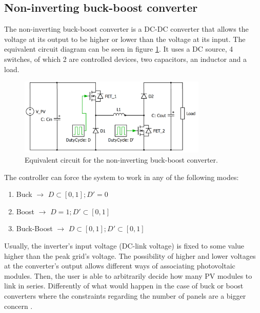 
\subsection{Non-inverting buck-boost converter\label{N_INV_BB}}
		
The non-inverting buck-boost converter is a DC-DC converter that allows the voltage at its output to be higher or lower than the voltage at its input. The equivalent circuit diagram can be seen in figure \ref{N_INV_BB_SCHEMATIC}. It uses a DC source, 4 switches, of which 2 are controlled devices, two capacitors, an inductor and a load.
		
\begin{figure}[H]
	\begin{center}
	\includegraphics[width=0.8\textwidth]{../Pictures/2_d_H_B_BB}
	\caption{Equivalent circuit for the non-inverting buck-boost converter.}
	\label{N_INV_BB_SCHEMATIC}
	\end{center}	
\end{figure}
	
The controller can force the system to work in any of the following modes:

\begin{enumerate}
	\item Buck $\rightarrow$ $ D \subset [0,1];	 D' = 0 $
	\item Boost $\rightarrow$ $ D = 1;	 D' \subset [0,1] $
	\item Buck-Boost $\rightarrow$ $ D \subset [0,1]; D' \subset [0,1] $
\end{enumerate}
		
Usually, the inverter's input voltage (DC-link voltage) is fixed to some value higher than the peak grid's voltage. The possibility of higher and lower voltages at the converter's output allows different ways of associating photovoltaic modules. Then, the user is able to arbitrarily decide how many PV modules to link in series. Differently of what would happen in the case of buck or boost converters where the constraints regarding the number of panels are a bigger concern .
		
